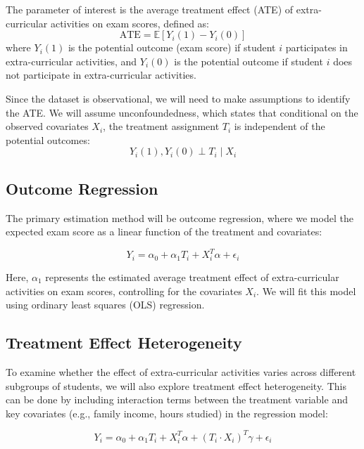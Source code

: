 \documentclass[11pt]{article}
\begin{document}
The parameter of interest is the average treatment effect (ATE) of extra-curricular activities on exam scores, defined as:
\begin{equation*}
\text{ATE} = \mathbb{E}[Y_i(1) - Y_i(0)]
\end{equation*}
where $Y_i(1)$ is the potential outcome (exam score) if student $i$ participates in extra-curricular activities, and $Y_i(0)$ is the potential outcome if student $i$ does not participate in extra-curricular activities.

Since the dataset is observational, we will need to make assumptions to identify the ATE. We will assume unconfoundedness, which states that conditional on the observed covariates $X_i$, the treatment assignment $T_i$ is independent of the potential outcomes:
\begin{equation*}
Y_i(1), Y_i(0) \perp T_i \mid X_i
\end{equation*}

\subsection{Outcome Regression}

The primary estimation method will be outcome regression, where we model the expected exam score as a linear function of the treatment and covariates:

\begin{equation*}
Y_i  = \alpha_0 + \alpha_1 T_i + X_i^T \alpha + \epsilon_i
\end{equation*}

Here, $\alpha_1$ represents the estimated average treatment effect of extra-curricular activities on exam scores, controlling for the covariates $X_i$. We will fit this model using ordinary least squares (OLS) regression.


\subsection{Treatment Effect Heterogeneity}

To examine whether the effect of extra-curricular activities varies across different subgroups of students, we will also explore treatment effect heterogeneity. This can be done by including interaction terms between the treatment variable and key covariates (e.g., family income, hours studied) in the regression model:

\begin{equation*}
Y_i = \alpha_0 + \alpha_1 T_i + X_i^T \alpha + (T_i \cdot X_i)^T \gamma + \epsilon_i
\end{equation*}
\end{document}
